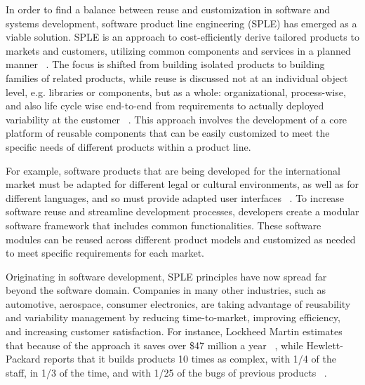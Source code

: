 \documentclass[sigconf,review]{acmart}
\begin{document}
In order to find a balance between reuse and customization in software and systems development, software product line engineering (SPLE) has emerged as a viable solution. 
SPLE is an approach to cost-efficiently derive tailored products to markets and customers, utilizing common components and services in a planned manner ~\cite{Runeson_2012}.
The focus is shifted from building isolated products to building families of related products, while reuse is discussed not at an individual object level, e.g. libraries or components, but as a whole: organizational, process-wise, and also life cycle wise end-to-end from requirements to actually deployed variability at the customer ~\cite{Schwanninger_2009}. 
This approach involves the development of a core platform of reusable components that can be easily customized to meet the specific needs of different products within a product line. 

For example, software products that are being developed for the international market must be adapted for different legal or cultural environments, as well as for different languages, and so must provide adapted user interfaces ~\cite{Beuche_2007}. 
To increase software reuse and streamline development processes, developers create a modular software framework that includes common functionalities. 
These software modules can be reused across different product models and customized as needed to meet specific requirements for each market.

Originating in software development, SPLE principles have now spread far beyond the software domain. 
Companies in many other industries, such as automotive, aerospace, consumer electronics, are taking advantage of reusability and variability management by reducing time-to-market, improving efficiency, and increasing customer satisfaction. 
For instance, Lockheed Martin estimates that because of the approach it saves over \$47 million a year ~\cite{Gregg_2015}, while Hewlett-Packard reports that it builds products 10 times as complex, with 1/4 of the staff, in 1/3 of the time, and with 1/25 of the bugs of previous products ~\cite{Mebane_2007}.

\end{document}
